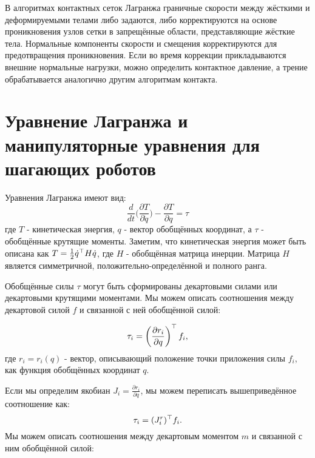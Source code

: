 В алгоритмах контактных сеток Лагранжа граничные скорости между жёсткими и деформируемыми телами либо задаются, либо корректируются на основе проникновения узлов сетки в запрещённые области, представляющие жёсткие тела. Нормальные компоненты скорости и смещения корректируются для предотвращения проникновения. Если во время коррекции прикладываются внешние нормальные нагрузки, можно определить контактное давление, а трение обрабатывается аналогично другим алгоритмам контакта.

\section{Уравнение Лагранжа и манипуляторные уравнения для шагающих роботов}\label{sec:ch2/sect3}

Уравнения Лагранжа имеют вид:
%
\begin{equation}
	\frac{d}{dt} \bigg( 
	\frac{\partial T }{\partial \dot{{q}}}
	\bigg) - 
	\frac{\partial T }{\partial {q}} = \tau
\end{equation}
%
где $T$ - кинетическая энергия, ${q}$ - вектор обобщённых координат, а $\tau$ - обобщённые крутящие моменты. Заметим, что кинетическая энергия может быть описана как $T = \frac{1}{2} \dot{{q}}^\top {H} \dot{{q}}$, где ${H}$ - обобщённая матрица инерции. Матрица ${H}$ является симметричной, положительно-определённой и полного ранга.

Обобщённые силы $\tau$ могут быть сформированы декартовыми силами или декартовыми крутящими моментами. Мы можем описать соотношения между декартовой силой ${f}$ и связанной с ней обобщённой силой:

\begin{equation}
	\tau_i = \left( \frac{\partial {r}_i}{\partial {q}} \right)^\top {f}_i,
\end{equation}
%
где ${r}_i = {r}_i({q})$ - вектор, описывающий положение точки приложения силы ${f}_i$, как функция обобщённых координат ${q}$.

Если мы определим якобиан ${J}_i = \frac{\partial {r}_i}{\partial {q}}$, мы можем переписать вышеприведённое соотношение как:
%
\begin{equation}
	\tau_i = ({J}^r_i)^\top {f}_i.
\end{equation}
Мы можем описать соотношения между декартовым моментом ${m}$ и связанной с ним обобщённой силой:

